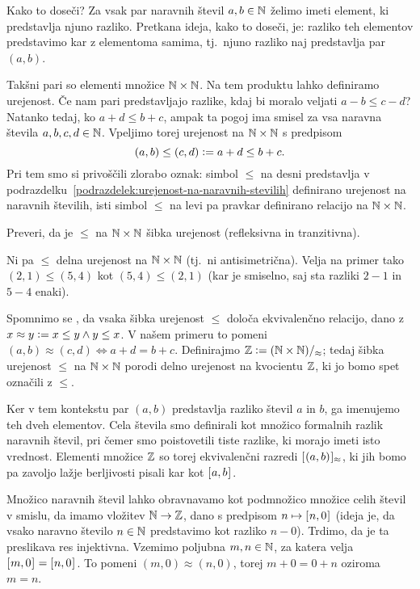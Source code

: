 Kako to doseči? Za vsak par naravnih števil $a, b \in \NN$ želimo imeti element, ki predstavlja njuno razliko. Pretkana ideja, kako to doseči, je: razliko teh elementov predstavimo kar z elementoma samima, tj.~njuno razliko naj predstavlja par $(a, b)$.

Takšni pari so elementi množice $\NN \times \NN$. Na tem produktu lahko definiramo urejenost. Če nam pari predstavljajo razlike, kdaj bi moralo veljati $a - b \leq c - d$? Natanko tedaj, ko $a + d \leq b + c$, ampak ta pogoj ima smisel za vsa naravna števila $a, b, c, d \in \NN$. Vpeljimo torej urejenost na $\NN \times \NN$ s predpisom
\[(a, b) \leq (c, d) \dfeq a + d \leq b + c.\]
Pri tem smo si privoščili zlorabo oznak: simbol $\leq$ na desni predstavlja v podrazdelku~\ref{podrazdelek:urejenost-na-naravnih-stevilih} definirano urejenost na naravnih številih, isti simbol $\leq$ na levi pa pravkar definirano relacijo na $\NN \times \NN$.

\begin{naloga}
Preveri, da je $\leq$ na $\NN \times \NN$ šibka urejenost (refleksivna in tranzitivna).
\end{naloga}

Ni pa $\leq$ delna urejenost na $\NN \times \NN$ (tj.~ni antisimetrična). Velja na primer tako $(2, 1) \leq (5, 4)$ kot $(5, 4) \leq (2, 1)$ (kar je smiselno, saj sta razliki $2 - 1$ in $5 - 4$ enaki).

Spomnimo se , da vsaka šibka urejenost $\leq$ določa ekvivalenčno relacijo, dano z $x \approx y \dfeq x \leq y \land y \leq x$. V našem primeru to pomeni $(a, b) \approx (c, d) \iff a + d = b + c$. Definirajmo $\ZZ \dfeq (\NN \times \NN)/_\approx$; tedaj šibka urejenost $\leq$ na $\NN \times \NN$ porodi delno urejenost na kvocientu $\ZZ$, ki jo bomo spet označili z $\leq$.

Ker v tem kontekstu par $(a, b)$ predstavlja razliko števil $a$ in $b$, ga imenujemo  teh dveh elementov. Cela števila smo definirali kot množico formalnih razlik naravnih števil, pri čemer smo poistovetili tiste razlike, ki morajo imeti isto vrednost. Elementi množice $\ZZ$ so torej ekvivalenčni razredi $\ec[\approx]{(a, b)}$, ki jih bomo pa zavoljo lažje berljivosti pisali kar kot $\ec{a, b}$.

Množico naravnih števil lahko obravnavamo kot podmnožico množice celih števil v smislu, da imamo vložitev $\NN \to \ZZ$, dano s predpisom $n \mapsto \ec{n, 0}$ (ideja je, da vsako naravno število $n \in \NN$ predstavimo kot razliko $n - 0$).  Trdimo, da je ta preslikava res injektivna. Vzemimo poljubna $m, n \in \NN$, za katera velja $\ec{m, 0} = \ec{n, 0}$. To pomeni $(m, 0) \approx (n, 0)$, torej $m + 0 = 0 + n$ oziroma $m = n$.

